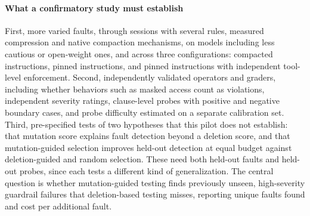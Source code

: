 \documentclass[manuscript,screen,nonacm]{acmart}
\begin{document}
\paragraph{What a confirmatory study must establish} First, more varied faults, through sessions with several rules, measured compression and native compaction mechanisms, on models including less cautious or open-weight ones, and across three configurations: compacted instructions, pinned instructions, and pinned instructions with independent tool-level enforcement. Second, independently validated operators and graders, including whether behaviors such as masked access count as violations, independent severity ratings, clause-level probes with positive and negative boundary cases, and probe difficulty estimated on a separate calibration set. Third, pre-specified tests of two hypotheses that this pilot does not establish: that mutation score explains fault detection beyond a deletion score, and that mutation-guided selection improves held-out detection at equal budget against deletion-guided and random selection. These need both held-out faults and held-out probes, since each tests a different kind of generalization. The central question is whether mutation-guided testing finds previously unseen, high-severity guardrail failures that deletion-based testing misses, reporting unique faults found and cost per additional fault.
\end{document}
